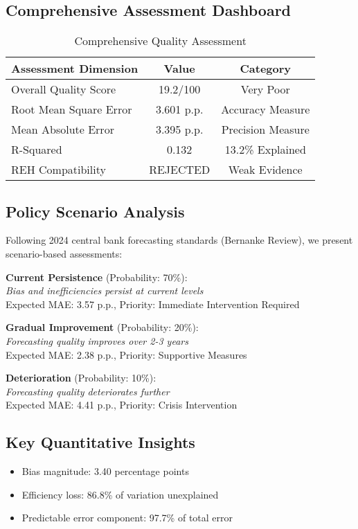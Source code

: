\documentclass[11pt,a4paper]{article}
\begin{document}
\subsection{Comprehensive Assessment Dashboard}
\begin{table}[H]
  \centering
  \caption{Comprehensive Quality Assessment}
  \begin{tabular}{lcc}
    \toprule
    \textbf{Assessment Dimension} & \textbf{Value}                    & \textbf{Category} \\
    \midrule
    Overall Quality Score         & 19.2/100                          & Very Poor         \\
    Root Mean Square Error        & 3.601 p.p.                        & Accuracy Measure  \\
    Mean Absolute Error           & 3.395 p.p.                        & Precision Measure \\
    R-Squared                     & 0.132                             & 13.2\% Explained  \\
    REH Compatibility             & \textcolor{academicred}{REJECTED} & Weak Evidence     \\
    \bottomrule
  \end{tabular}
\end{table}

\subsection{Policy Scenario Analysis}
Following 2024 central bank forecasting standards (Bernanke Review), we present scenario-based assessments:

\textbf{Current Persistence} (Probability: 70\%):\\
\textit{Bias and inefficiencies persist at current levels}\\
Expected MAE: 3.57 p.p., Priority: Immediate Intervention Required

\textbf{Gradual Improvement} (Probability: 20\%):\\
\textit{Forecasting quality improves over 2-3 years}\\
Expected MAE: 2.38 p.p., Priority: Supportive Measures

\textbf{Deterioration} (Probability: 10\%):\\
\textit{Forecasting quality deteriorates further}\\
Expected MAE: 4.41 p.p., Priority: Crisis Intervention

\subsection{Key Quantitative Insights}
\begin{itemize}
  \item Bias magnitude: 3.40 percentage points
  \item Efficiency loss: 86.8\% of variation unexplained
  \item Predictable error component: 97.7\% of total error
\end{itemize}
\end{document}
